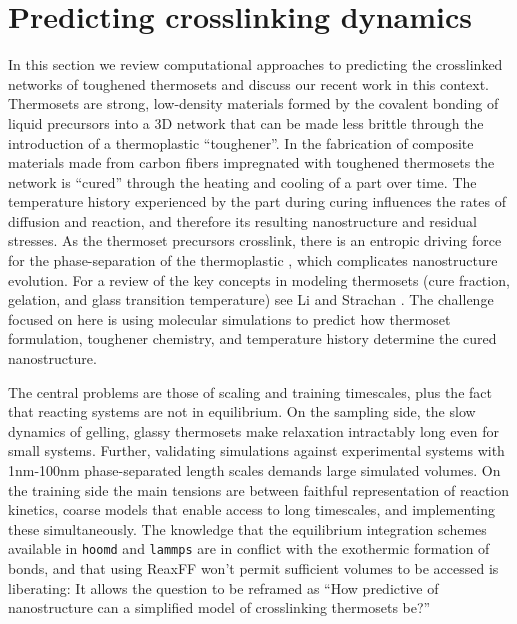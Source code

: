 \section{Predicting crosslinking dynamics}\label{s:epoxy}
In this section we review computational approaches to predicting the crosslinked networks of toughened thermosets and discuss our recent work in this context.
Thermosets are strong, low-density materials formed by the covalent bonding of liquid precursors into a 3D network that can be made less brittle through the introduction of a thermoplastic ``toughener''. 
In the fabrication of composite materials made from carbon fibers impregnated with toughened thermosets the network is ``cured'' through the heating and cooling of a part over time.
The temperature history experienced by the part during curing influences the rates of diffusion and reaction, and therefore its resulting nanostructure and residual stresses.
As the thermoset precursors crosslink, there is an entropic driving force for the phase-separation of the thermoplastic \cite{Chen1999a}, which complicates nanostructure evolution.
For a review of the key concepts in modeling thermosets (cure fraction, gelation, and glass transition temperature) see Li and Strachan \cite{Li2015f}. 
The challenge focused on here is using molecular simulations to predict how thermoset formulation, toughener chemistry, and temperature history determine the cured nanostructure.

The central problems are those of scaling and training timescales, plus the fact that reacting systems are not in equilibrium.
On the sampling side, the slow dynamics of gelling, glassy thermosets make relaxation intractably long even for small systems.
Further, validating simulations against experimental systems with 1nm-100nm phase-separated length scales demands large simulated volumes. 
On the training side the main tensions are between faithful representation of reaction kinetics, coarse models that enable access to long timescales, and implementing these simultaneously.
The knowledge that the equilibrium integration schemes available in \texttt{hoomd} and \texttt{lammps} are in conflict with the exothermic formation of bonds, and that using ReaxFF \cite{VanDuin2001} won't permit sufficient volumes to be accessed is liberating:
It allows the question to be reframed as ``How predictive of nanostructure can a simplified model of crosslinking thermosets be?''

